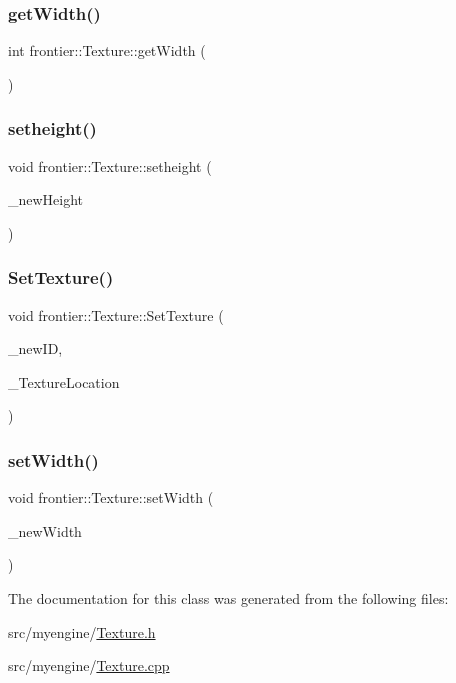 \subsubsection{\texorpdfstring{get\+Width()}{getWidth()}}
{\footnotesize\ttfamily int frontier\+::\+Texture\+::get\+Width (\begin{DoxyParamCaption}{ }\end{DoxyParamCaption})}

\mbox{\label{classfrontier_1_1_texture_af320a9ab95483f8ee0257822b8808ddf}} 
\subsubsection{\texorpdfstring{setheight()}{setheight()}}
{\footnotesize\ttfamily void frontier\+::\+Texture\+::setheight (\begin{DoxyParamCaption}\item[{int}]{\+\_\+new\+Height }\end{DoxyParamCaption})}

\mbox{\label{classfrontier_1_1_texture_aebcb88a76b11179ba97d70d9ee6d2a9b}} 
\subsubsection{\texorpdfstring{Set\+Texture()}{SetTexture()}}
{\footnotesize\ttfamily void frontier\+::\+Texture\+::\+Set\+Texture (\begin{DoxyParamCaption}\item[{G\+Luint}]{\+\_\+new\+ID,  }\item[{int}]{\+\_\+\+Texture\+Location }\end{DoxyParamCaption})}

\mbox{\label{classfrontier_1_1_texture_a6e9f3458f2379c2c1da8ef37fff44e23}} 
\subsubsection{\texorpdfstring{set\+Width()}{setWidth()}}
{\footnotesize\ttfamily void frontier\+::\+Texture\+::set\+Width (\begin{DoxyParamCaption}\item[{int}]{\+\_\+new\+Width }\end{DoxyParamCaption})}



The documentation for this class was generated from the following files\+:\begin{DoxyCompactItemize}
\item 
src/myengine/\hyperlink{_texture_8h}{Texture.\+h}\item 
src/myengine/\hyperlink{_texture_8cpp}{Texture.\+cpp}\end{DoxyCompactItemize}
